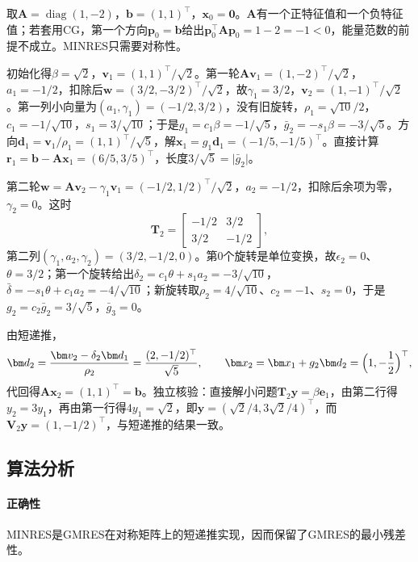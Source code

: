 \begin{example}[对称不定矩阵上的MINRES]
\label{ex:ls-minres-indefinite}
取$\bm A=\operatorname{diag}(1,-2)$，$\bm b=(1,1)^\top$，$\bm x_0=\bm0$。$\bm A$有一个正特征值和一个负特征值；若套用CG，第一个方向$\bm p_0=\bm b$给出$\bm p_0^\top\bm A\bm p_0=1-2=-1<0$，能量范数的前提不成立。MINRES只需要对称性。

初始化得$\beta=\sqrt2$，$\bm v_1=(1,1)^\top/\sqrt2$。第一轮$\bm A\bm v_1=(1,-2)^\top/\sqrt2$，$a_1=-1/2$，扣除后$\bm w=(3/2,-3/2)^\top/\sqrt2$，故$\gamma_1=3/2$，$\bm v_2=(1,-1)^\top/\sqrt2$。第一列小向量为$(a_1,\gamma_1)=(-1/2,3/2)$，没有旧旋转，$\rho_1=\sqrt{10}/2$，$c_1=-1/\sqrt{10}$，$s_1=3/\sqrt{10}$；于是$g_1=c_1\beta=-1/\sqrt5$，$\bar g_2=-s_1\beta=-3/\sqrt5$。方向$\bm d_1=\bm v_1/\rho_1=(1,1)^\top/\sqrt5$，解$\bm x_1=g_1\bm d_1=(-1/5,-1/5)^\top$。直接计算$\bm r_1=\bm b-\bm A\bm x_1=(6/5,3/5)^\top$，长度$3/\sqrt5=\lvert\bar g_2\rvert$。

第二轮$\bm w=\bm A\bm v_2-\gamma_1\bm v_1=(-1/2,1/2)^\top/\sqrt2$，$a_2=-1/2$，扣除后余项为零，$\gamma_2=0$。这时
\[
 \bm T_2=\begin{bmatrix}-1/2&3/2\\3/2&-1/2\end{bmatrix},
\]
第二列$(\gamma_1,a_2,\gamma_2)=(3/2,-1/2,0)$。第$0$个旋转是单位变换，故$\epsilon_2=0$、$\theta=3/2$；第一个旋转给出$\delta_2=c_1\theta+s_1a_2=-3/\sqrt{10}$，$\bar\delta=-s_1\theta+c_1a_2=-4/\sqrt{10}$；新旋转取$\rho_2=4/\sqrt{10}$、$c_2=-1$、$s_2=0$，于是$g_2=c_2\bar g_2=3/\sqrt5$，$\bar g_3=0$。

由短递推，
\[
 \bm d_2=\frac{\bm v_2-\delta_2\bm d_1}{\rho_2}=\frac{(2,-1/2)^\top}{\sqrt5},\qquad
 \bm x_2=\bm x_1+g_2\bm d_2=\Bigl(1,-\frac12\Bigr)^\top ,
\]
代回得$\bm A\bm x_2=(1,1)^\top=\bm b$。独立核验：直接解小问题$\bm T_2\bm y=\beta\bm e_1$，由第二行得$y_2=3y_1$，再由第一行得$4y_1=\sqrt2$，即$\bm y=(\sqrt2/4,3\sqrt2/4)^\top$，而$\bm V_2\bm y=(1,-1/2)^\top$，与短递推的结果一致。
\end{example}

\subsection{算法分析}

\paragraph{正确性}
MINRES是GMRES在对称矩阵上的短递推实现，因而保留了GMRES的最小残差性。

